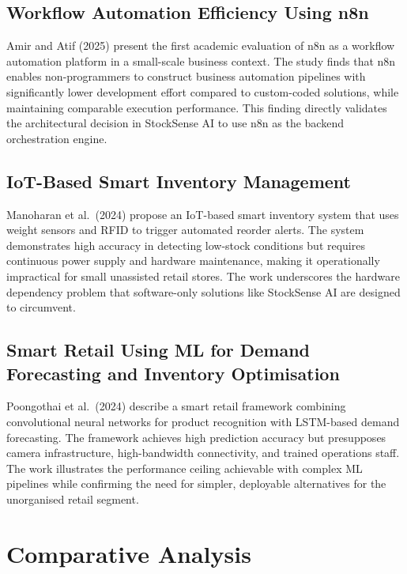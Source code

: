\subsection{Workflow Automation Efficiency Using n8n}

Amir and Atif (2025) \cite{amir2025} present the first academic evaluation of n8n as a workflow
automation platform in a small-scale business context. The study finds that n8n enables
non-programmers to construct business automation pipelines with significantly lower development
effort compared to custom-coded solutions, while maintaining comparable execution performance.
This finding directly validates the architectural decision in StockSense AI to use n8n as the
backend orchestration engine.

\subsection{IoT-Based Smart Inventory Management}

Manoharan et al.\ (2024) \cite{manoharan2024} propose an IoT-based smart inventory system that
uses weight sensors and RFID to trigger automated reorder alerts. The system demonstrates
high accuracy in detecting low-stock conditions but requires continuous power supply and
hardware maintenance, making it operationally impractical for small unassisted retail stores.
The work underscores the hardware dependency problem that software-only solutions like
StockSense AI are designed to circumvent.

\subsection{Smart Retail Using ML for Demand Forecasting and Inventory Optimisation}

Poongothai et al.\ (2024) \cite{poongothai2024} describe a smart retail framework combining
convolutional neural networks for product recognition with LSTM-based demand forecasting. The
framework achieves high prediction accuracy but presupposes camera infrastructure, high-bandwidth
connectivity, and trained operations staff. The work illustrates the performance ceiling
achievable with complex ML pipelines while confirming the need for simpler, deployable
alternatives for the unorganised retail segment.

\section{Comparative Analysis}

